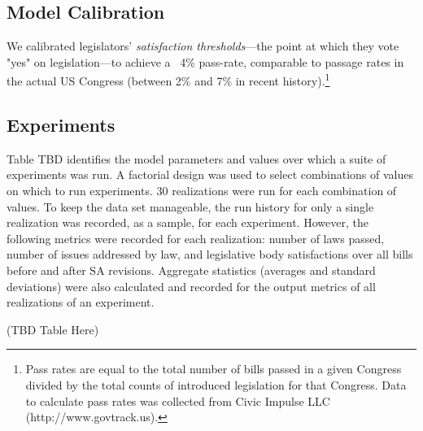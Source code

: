 \documentclass[pdftex,12pt]{llncs}
\begin{document}
\subsection{Model Calibration}
We calibrated legislators' \textit{satisfaction thresholds}---the point at which they vote "yes" on legislation---to achieve a ~4\% pass-rate, comparable to passage rates in the actual US Congress (between 2\% and 7\% in recent history).\footnote{Pass rates are equal to the total number of bills passed in a given Congress divided by the total counts of introduced legislation for that Congress. Data to calculate pass rates was collected from Civic Impulse LLC (http://www.govtrack.us).\label{passfn}}

\subsection{Experiments}
Table TBD identifies the model parameters and values over which a suite of experiments was run.
A factorial design was used to select combinations of values on which to run experiments.
30 realizations were run for each combination of values.
To keep the data set manageable, the run history for only a single realization was recorded, as a sample, for each experiment.
However, the following metrics were recorded for each realization:  number of laws passed, number of issues addressed by law, and legislative body satisfactions over all bills before and after SA revisions.
Aggregate statistics (averages and standard deviations) were also calculated and recorded for the output metrics of all realizations of an experiment.

(TBD Table Here)
\end{document}
